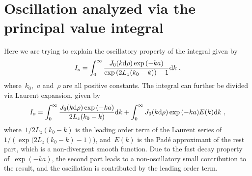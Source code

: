 \section{Oscillation analyzed via the principal value integral}\label{sec::oscillation}

Here we are trying to explain the oscillatory property of the integral given by
\begin{equation}
    I_o = \int_0^{\infty} \frac{J_0(k \mathrm{d} \rho) \exp{(-k a)}}{\exp{(2L_z(k_0 - k))} - 1} \text{d}k\;,
\end{equation}
where~$k_0$,~$a$ and~$\rho$ are all positive constants.
The integral can further be divided via Laurent expansion, given by
\begin{equation}
    I_o = \int_0^{\infty} \frac{J_0(k \mathrm{d} \rho) \exp{(-k a)}}{2L_z(k_0 - k)} \text{d}k + \int_0^{\infty} J_0(k \mathrm{d} \rho) \exp{(-k a)} E(k) \text{d}k\;,
\end{equation}
where~$1/2L_z(k_0 - k)$ is the leading order term of the Laurent series of~$1/(\exp{(2L_z(k_0 - k)} - 1))$, and~$E(k)$ is the Padé approximant of the rest part, which is a non-divergent smooth function.
Due to the fast decay property of~$\exp{(-k a)}$, the second part leads to a non-oscillatory small contribution to the result, and the oscillation is contributed by the leading order term.

